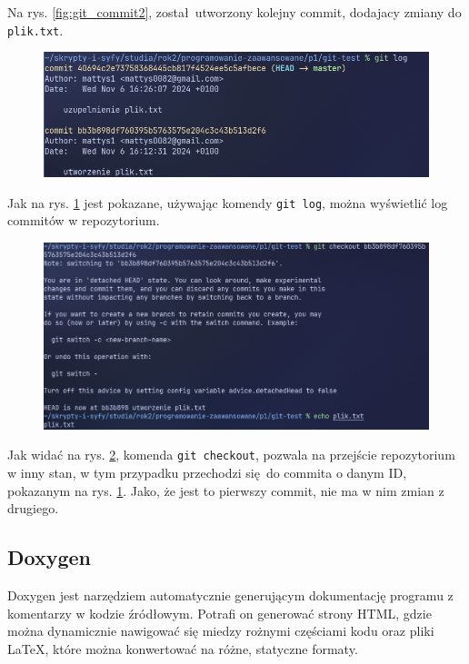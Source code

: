 Na rys. \ref{fig:git_commit2}, został utworzony kolejny commit, dodajacy zmiany do \texttt{plik.txt}.

\begin{figure}[H]
	\centering
	\includegraphics[width=1\textwidth]{images/git_log.png}
	\caption{}
	\label{fig:git_log}
\end{figure}

Jak na rys. \ref{fig:git_log} jest pokazane, używając komendy \texttt{git log}, można wyświetlić log commitów w repozytorium.

\begin{figure}[H]
	\centering
	\includegraphics[width=1\textwidth]{images/git_checkout.png}
	\caption{}
	\label{fig:git_checkout}
\end{figure}

Jak widać na rys. \ref{fig:git_checkout}, komenda \texttt{git checkout}, pozwala na przejście repozytorium w inny stan, w tym przypadku przechodzi się do commita o danym ID, pokazanym na rys. \ref{fig:git_log}. Jako, że jest to pierwszy commit, nie ma w nim zmian z drugiego.
\subsection{Doxygen}
Doxygen\cite{doxygensite} jest narzędziem automatycznie generującym dokumentację programu z komentarzy w kodzie źródłowym. Potrafi on generować strony HTML, gdzie można dynamicznie nawigować się miedzy rożnymi częściami kodu oraz pliki \LaTeX, które można konwertować na różne, statyczne formaty.
